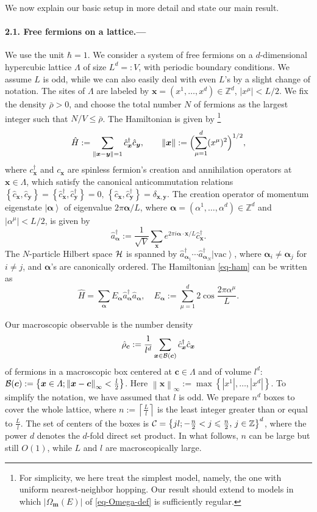 \documentclass[aps,prl,superscriptaddress,reprint]{revtex4-2}
\newcommand{\se}[1]{\paragraph{#1.---}}
\theoremstyle{definition}
\newcommand{\abs}[1]{{\left\vert #1 \right\vert}}
\newcommand{\brac}[1]{{\left\{ #1 \right\}}}
\newcommand{\HH}{{\cal H}}
\newcommand{\CC}{{\cal C}}
\newcommand{\ba}[1]{\bar{#1}}
\newcommand{\ket}[1]{\left|{#1}\right\rangle}
\newcommand{\ha}{\hat}
\newcommand{\da}[1]{#1^\dag}
\newcommand{\acom}[2]{\left\{{#1},{#2}\right\}}
\newcommand{\ac}{\acom}
\renewcommand{\a}{\alpha}
\renewcommand{\d}{\delta}
\newcommand{\La}{\varLambda}
\newcommand{\m}{\mu}
\newcommand{\Om}{\Omega}
\renewcommand{\r}{\rho}
\newcommand{\f}{\frac}
\newcommand{\q}{\quad}
\newcommand{\ve}[1]{\boldsymbol{#1}}
\newcommand{\norm}[1]{\left\|#1\right\|}
\newcommand{\normi}[1]{\left\|#1\right\|_\infty}
\renewcommand{\le}{\leqslant}
\newcommand{\tx}{\text}
\newcommand{\ceil}[1]{\left\lceil#1\right\rceil}
\newcommand{\ketvac}{\ket{\tx{vac}}}
\newcommand{\xx}{{\ve x}}
\newcommand{\yy}{{\ve y}}
\renewcommand{\aa}{{\ve \a}}
\newcommand{\mm}{{\ve m}}
\newcommand{\bo}[1]{{\cal B}(#1)}
\begin{document}
We now explain our basic setup in more detail and state our main result.
\se{2.1. Free fermions on a lattice}
We use the unit $\hbar=1$.
We consider a system of free fermions on a $d$-dimensional
hypercubic lattice $\La$ of size $L^d=:V$,
with periodic boundary conditions.
We assume $L$ is odd,
while we can also easily deal with even $L$'s by
a slight change of  notation.
The sites of $\La$ are labeled by
$\xx=(x^1, \dots,x^d) \in {\mathbb Z}^d$, $\abs{x^\m}<L/2$.
We fix the density $\ba\r>0$,
and choose the total number $N$ of
fermions as the largest integer such that $N/V \le \ba\r$.
The Hamiltonian is given by
\footnote{For simplicity, we here treat the simplest model, namely,
  the one with uniform nearest-neighbor hopping.
Our result should extend to models in
which $\abs{\Om_\mm(E)}$
of \eqref{eq-Omega-def}
is sufficiently regular.
}
\begin{align}
	\ha H:= \sum_{\norm{\xx-\yy}=1}\da {\ha c}_\xx \ha c_\yy,
	\qquad \|\xx\| := \Bigl ( \sum_{\mu=1}^{d} (x^\mu)^2 \Bigr )^{1/2}
	,
  	\label{eq-ham}
\end{align}
where $\da c_\xx$ and $c_\xx$
are spinless fermion's creation and annihilation operators at $\xx\in\La$,
which satisfy the canonical anticommutation relations
$
  \ac {\ha c_\xx}{\ha c_\yy}=  \ac {\da{\ha c}_\xx}{\da{\ha c}_\yy}=0,\,
  \ac {\ha c_\xx}{\da{\ha c}_\yy}=\d_{\xx,\yy}.
$
The creation operator of momentum
eigenstate $\ket\aa$ of eigenvalue $2\pi\aa/L$,
where $\aa = (\alpha^1, \dots, \alpha^d)\in {\mathbb Z}^d$ and $\abs{\a^\m}<L/2$, is given by
\begin{equation}
  	\da {\ha a}_\aa
  	:=\f1{\sqrt V}\sum_\xx e^{2\pi i\aa\cdot\xx/L}
  	\da {\ha c}_\xx
	.
   	\label{eq-a}
\end{equation}
The $N$-particle Hilbert space $\HH$ is spanned
by $\da {\ha a}_{\aa_1} \cdots \da {\ha a}_{\aa_N}\ketvac$,
where $\aa_i \neq \aa_j$ for $i \neq j$, and $\aa$'s are
canonically ordered.
The Hamiltonian \eqref{eq-ham} can be written as
\begin{equation}
  	\ha H=\sum_\aa E_\aa \da{\ha a}_\aa {\ha a}_\aa,
  	\q
  	E_\aa:=\sum_{\m=1}^d
  	2\cos\f{2\pi \a^\m}L.
  	\label{eq-H-in-a}
\end{equation}



Our macroscopic observable is
the number density
\begin{equation}
  	\ha\r_{\ve c}:=
  	\f1{l^d}
  	\sum_{\xx\in \bo{\ve c}}\da {\ha c}_\xx \ha c_\xx
  	\label{eq-rho}
\end{equation}
of fermions in a macroscopic box centered at $\ve c\in\La$ and
of volume $l^d$:
$
\bo{\ve c}:=\brac{\xx\in\La; \normi{\xx-\ve c}<\f l2}
$.
Here $\normi\xx:=\max\brac{|x^1|, \dots, |x^d|}$.
To simplify the notation, we have assumed that $l$ is odd.
We prepare $n^d$ boxes to cover the whole lattice, where
$n:=\ceil{\tfrac{L}{l}}$
is the least integer greater than or equal to $\tfrac{L}{l}$.
The set of centers of the boxes is
$\CC=\bigl\{jl; -\f{n}2<j\le \f{n}2 , \, j \in \mathbb{Z} \bigr\}^d$,
where
the power $d$ denotes the $d$-fold direct set product.
In what follows, $n$ can be large but still $O(1)$,
while  $L$ and $l$ are macroscopically large.
\end{document}
